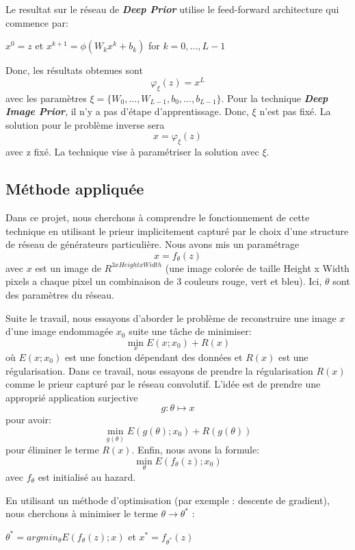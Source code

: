 \documentclass[
  11pt,
  dvipsnames]{article}
\begin{document}
Le resultat sur le réseau de \textbf{\emph{Deep Prior}} utilise le feed-forward architecture qui commence par:

\begin{center} $x^0 = z$    et    $x^{k+1} = \phi (W_k x^k + b_k)$ for $k = 0,...,L-1$  \end{center}

Donc, les résultats obtenues sont \[\varphi_\xi(z) = x^L\] avec les paramètres \(\xi = \{W_0,...,W_{L-1},b_0,...,b_{L-1}\}\).
Pour la technique \textbf{\emph{Deep Image Prior}}, il n'y a pas d'étape d'apprentissage. Donc, \(\xi\) n'est pas fixé.
La solution pour le problème inverse sera \[x=\varphi_\xi(z)\] avec z fixé. La technique vise à paramétriser la solution avec \(\xi\).

\hypertarget{muxe9thode-appliquuxe9e}{%
\subsection{Méthode appliquée}\label{muxe9thode-appliquuxe9e}}

Dans ce projet, nous cherchons à comprendre le fonctionnement de cette technique
en utilisant le prieur implicitement capturé par le choix d'une structure de réseau de générateurs particulière.
Nous avons mis un paramétrage \[x = f_\theta(z)\] avec \(x\) est un image de \(R^{3xHeightxWidth}\) (une image colorée de taille
Height x Width pixels a chaque pixel un combinaison de 3 couleurs rouge, vert et bleu).
Ici, \(\theta\) sont des paramètres du réseau.

Suite le travail, nous essayons d'aborder le problème de reconstruire une image \(x\) d'une image endommagée \(x_0\) suite une tâche de minimiser: \[\min_{x} E(x;x_0) + R(x)\] où \(E(x;x_0)\) est une fonction dépendant des données et \(R(x)\) est une régularisation. Dans ce travail, nous essayons de prendre la régularisation \(R(x)\) comme le prieur capturé par le réseau convolutif. L'idée est de prendre une approprié application surjective \[g: \theta \mapsto x\] pour avoir: \[\min_{g(\theta)} E(g(\theta);x_0) + R(g(\theta))\] pour éliminer le terme \(R(x)\). Enfin, nous avons la formule: \[\min_{\theta} E(f_{\theta}(z);x_0)\] avec \(f_{\theta}\) est initialisé au hazard.

En utilisant un méthode d'optimisation (par exemple : descente de gradient), nous cherchons à minimiser le terme \(\theta \rightarrow \theta^*\) :

\begin {center} $\theta ^* = argmin_{\theta} E(f_{\theta}(z);x)$ et $x^* = f_{\theta^*}(z)$ \end {center}
\end{document}
